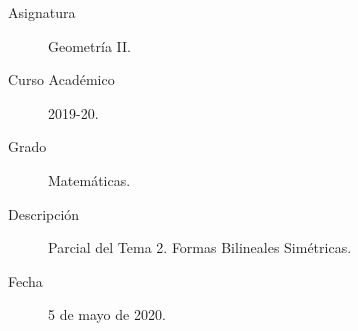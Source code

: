 \documentclass[12pt]{article}
\begin{document}

    
    

    \begin{description}
        \item[Asignatura] Geometría II.
        \item[Curso Académico] 2019-20.
        \item[Grado] Matemáticas.
        \item[Descripción] Parcial del Tema 2. Formas Bilineales Simétricas.
        \item[Fecha] 5 de mayo de 2020.
    
    \end{description}
    \newpage
    
\end{document}
